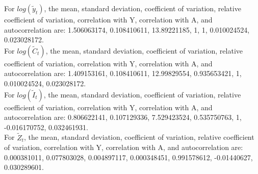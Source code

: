 \documentclass{amsart}
\theoremstyle{plain}
\begin{document}
For $log(\tilde{y}_t)$, the mean, standard deviation, coefficient of variation, relative coefficient of variation, correlation with Y, correlation with A, and autocorrelation are: 1.506063174,	0.108410611,	13.89221185,	1,	1,	0.010024524,	0.023028172.\\
For $log(\tilde{C}_t)$, the mean, standard deviation, coefficient of variation, relative coefficient of variation, correlation with Y, correlation with A, and autocorrelation are: 1.409153161,	0.108410611,	12.99829554,	0.935653421,	1,	0.010024524,	0.023028172.\\
For $log(\tilde{I}_t)$, the mean, standard deviation, coefficient of variation, relative coefficient of variation, correlation with Y, correlation with A, and autocorrelation are: 0.806622141,	0.107129336,	7.529423524,	0.535750763,	1,	-0.016170752,	0.032461931.\\
For $\tilde{Z}_t$, the mean, standard deviation, coefficient of variation, relative coefficient of variation, correlation with Y, correlation with A, and autocorrelation are: 0.000381011,	0.077803028,	0.004897117,	0.000348451,	0.991578612,	-0.01440627,	0.030289601.\\ \\
\end{document}
